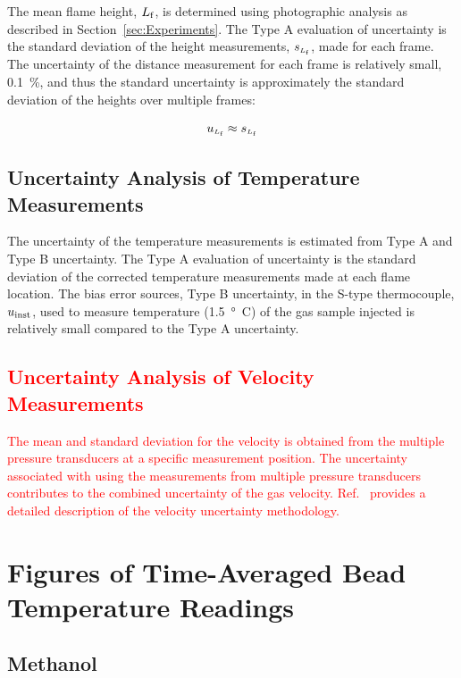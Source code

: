 \documentclass[12pt]{article}
\begin{document}
The mean flame height, ${L_{\rm{f}}}$, is determined using photographic analysis as described in Section~\ref{sec:Experiments}. The Type A evaluation of uncertainty is the standard deviation of the height measurements, $s_{\scriptscriptstyle L_{\rm{f}}}$, made for each frame. The uncertainty of the distance measurement for each frame is relatively small, 0.1~\%, and thus the standard uncertainty is approximately the standard deviation of the heights over multiple frames:

\begin{equation}
\label{eq:mean_flame_height}
u_{\scriptscriptstyle L_{\rm{f}}} \approx s_{\scriptscriptstyle{L_{\rm f}}}
\end{equation}


\subsection{Uncertainty Analysis of Temperature Measurements}
\label{sec:Uncertainty_Temperature_Measurements}
The uncertainty of the temperature measurements is estimated from Type A and Type B uncertainty. The Type A evaluation of uncertainty is the standard deviation of the corrected temperature measurements made at each flame location. The bias error sources, Type B uncertainty, in the S-type thermocouple, $u_{\rm inst}$, used to measure temperature (\SI{1.5}{\degree C}) of the gas sample injected is relatively small compared to the Type A uncertainty.

\textcolor{red}{\subsection{Uncertainty Analysis of Velocity Measurements}}
\textcolor{red}{The mean and standard deviation for the velocity is obtained from the multiple pressure transducers at a specific measurement position. The uncertainty associated with using the measurements from multiple pressure transducers contributes to the combined uncertainty of the gas velocity. Ref.~\cite{Sung2021} provides a detailed description of the velocity uncertainty methodology.}


\pagebreak

\section{Figures of Time-Averaged Bead Temperature Readings}\label{sec:Bead_Temp}

\subsection{Methanol}
\label{ssec:Methanol_Bead_Temp}
\end{document}
